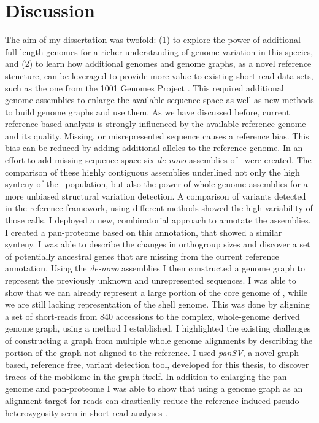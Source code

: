 \chapter{Discussion}

The aim of my dissertation was twofold: (1) to explore the power of additional full-length genomes for a richer understanding of genome variation in this species, and (2) to learn how additional genomes and genome graphs, as a novel reference structure, can be leveraged to provide more value to existing short-read data sets, such as the one from the 1001 Genomes Project \citep{1001_Genomes_Consortium_Electronic_address_magnusnordborggmioeawacat2016-pn}. This required additional genome assemblies to enlarge the available sequence space as well as new methods to build genome graphs and use them. As we have discussed before, current reference based analysis is strongly influenced by the available reference genome and its quality. Missing, or misrepresented sequence causes a reference bias. This bias can be reduced by adding additional alleles to the reference genome. In an effort to add missing sequence space six \textit{de-novo} assemblies of \ath\ were created. The comparison of these highly contiguous assemblies underlined not only the high synteny of the \ath\ population, but also the power of whole genome assemblies for a more unbiased structural variation detection. A comparison of variants detected in the reference framework, using different methods showed the high variability of those calls. I deployed a new, combinatorial approach to annotate the assemblies. I created a pan-proteome based on this annotation, that showed a similar synteny. I was able to describe the changes in orthogroup sizes and discover a set of potentially ancestral genes that are missing from the current reference annotation. Using the \textit{de-novo} assemblies I then constructed a genome graph to represent the previously unknown and unrepresented sequences. I was able to show that we can already represent a large portion of the core genome of \ath, while we are still lacking representation of the shell genome. This was done by aligning a set of short-reads from 840 accessions to the complex, whole-genome derived genome graph, using a method I established. I highlighted the existing challenges of constructing a graph from multiple whole genome alignments by describing the portion of the graph not aligned to the reference. I used \textit{panSV}, a novel graph based, reference free, variant detection tool, developed for this thesis, to discover traces of the mobilome in the graph itself. In addition to enlarging the pan-genome and pan-proteome I was able to show that using a genome graph as an alignment target for reads can drastically reduce the reference induced pseudo-heterozygosity seen in short-read analyses \citep{Jaegle2021-jw}.

